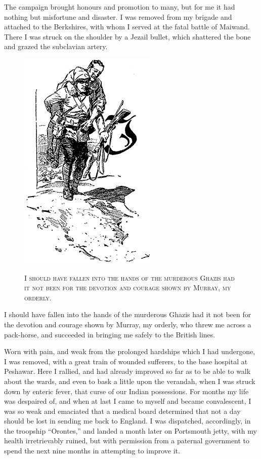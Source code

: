 \documentclass[12pt,english,oneside]{book}
\newcommand{\noun}[1]{\textsc{#1}}
\begin{document}
The campaign brought honours and promotion to many, but for me it
had nothing but misfortune and disaster. I was removed from my brigade
and attached to the Berkshires, with whom I served at the fatal battle
of Maiwand. There I was struck on the shoulder by a Jezail bullet,
which shattered the bone and grazed the subclavian artery. %
\begin{figure}[htbp]
\noindent \begin{center}\includegraphics{images/study10-stud-01.png}\end{center}

\noindent \begin{center}\noun{I should have fallen into the hands
of the murderous Ghazis had it not been for the devotion and courage
shown by Murray, my orderly.}\end{center}
\end{figure}
I should have fallen into the hands of the murderous Ghazis had it
not been for the devotion and courage shown by Murray, my orderly,
who threw me across a pack-horse, and succeeded in bringing me safely
to the British lines.

Worn with pain, and weak from the prolonged hardships which I had
undergone, I was removed, with a great train of wounded sufferers,
to the base hospital at Peshawar. Here I rallied, and had already
improved so far as to be able to walk about the wards, and even to
bask a little upon the verandah, when I was struck down by enteric
fever, that curse of our Indian possessions. For months my life was
despaired of, and when at last I came to myself and became convalescent,
I was so weak and emaciated that a medical board determined that not
a day should be lost in sending me back to England. I was dispatched,
accordingly, in the troopship {}``Orontes,'' and landed a month
later on Portsmouth jetty, with my health irretrievably ruined, but
with permission from a paternal government to spend the next nine
months in attempting to improve it.
\end{document}
